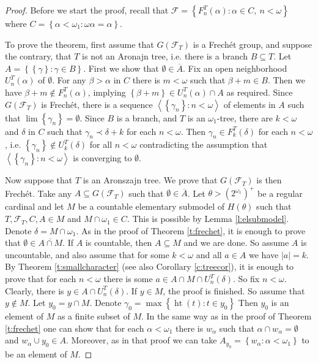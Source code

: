 \documentclass{amsart}
\theoremstyle{plain}
\theoremstyle{definition}
\numberwithin{equation}{section}
\renewcommand{\a}{\alpha}
\renewcommand{\b}{\beta}
\newcommand{\g}{\gamma}
\renewcommand{\d}{\delta}
\renewcommand{\o}{\omega}
\newcommand{\ps}{\emptyset}
\newcommand{\sst}{\subseteq}
\newcommand{\seq}[1]{\left<#1\right>}
\newcommand{\set}[1]{\left\{#1\right\}}
\newcommand{\abs}[1]{\left\vert#1\right\vert}
\newcommand{\h}{\operatorname{ht}}
\begin{document}
\begin{proof}
	Before we start the proof, recall that $\mathcal F=\set{F^T_n(\a)
	:\a\in C,\ n<\o}$ where $C=\set{\a<\o_1:\o\a=\a}$.

	To prove the theorem, first assume that $G(\mathcal F_T)$ is a Frech\'et group, and suppose the contrary, that $T$ is not an Aronajn tree, i.e. there is a branch $B\sst T$.
    Let $A=\set{\set{\g}:\g\in B}$.
    First we show that $\ps \in \overline{A}$.
    Fix an open neighborhood $U^T_{n}(\a)$ of $\ps$.
	For any $\b>\a$ in $C$ there is $m<\o$ such that $\b+m\in B$.
	Then we have $\b+m\notin F^T_{n}(\a)$, implying $\set{\b+m}\in U^T_{n}(\a)\cap A$ as required.
	Since $G(\mathcal F_T)$ is Frech\'et, there is a sequence $\seq{\set{\g_n}:n<\o}$ of elements in $A$ such that $\lim\set{\g_n}=\ps$.
	Since $B$ is a branch, and $T$ is an $\o_1$-tree, there are $k<\o$ and $\d$ in $C$ such that $\g_n\prec\d+k$ for each $n<\o$.
	Then $\g_n\in F^T_{k}(\d)$ for each $n<\o$, i.e. $\set{\g_n}\notin U^T_{k}(\d)$ for all $n<\o$ contradicting the assumption that $\seq{\set{\g_n}:n<\o}$ is converging to $\ps$.

	Now suppose that $T$ is an Aronszajn tree.
	We prove that $G(\mathcal F_T)$ is then Frech\'et.
	Take any $A\sst G(\mathcal F_T)$ such that $\ps\in\overline{A}$.
	Let $\theta>\left(2^{\o_1}\right)^+$ be a regular cardinal and let $M$ be a countable elementary submodel of $H\left(\theta\right)$ such that $T,\mathcal F_T,C,A\in M$ and $M\cap \o_1\in C$.
	This is possible by Lemma \ref{l:elsubmodel}.
	Denote $\d=M\cap \o_1$.
	As in the proof of Theorem \ref{t:frechet}, it is enough to prove that $\ps\in\overline{A\cap M}$.
	If $A$ is countable, then $A\sst M$ and we are done.
	So assume $A$ is uncountable, and also assume that for some $k<\o$ and all $a\in A$ we have $\abs{a}=k$.
	By Theorem \ref{t:smallcharacter} (see also Corollary \ref{c:treecor}), it is enough to prove that for each $n<\o$ there is some $a\in A\cap M\cap U^T_n(\d)$.
	So fix $n<\o$.
	Clearly, there is $y\in A\cap U^T_n(\d)$.
	If $y\in M$, the proof is finished.
	So assume that $y\notin M$.
	Let $y_0=y\cap M$.
	Denote $\g_0=\max\set{\h(t):t\in y_0}$
	Then $y_0$ is an element of $M$ as a finite subset of $M$.
	In the same way as in the proof of Theorem \ref{t:frechet} one can show that for each $\a<\o_1$ there is $w_{\a}$ such that $\a\cap w_{\a}=\ps$ and $w_{\a}\cup y_0\in A$.
	Moreover, as in that proof we can take $A_{y_0}=\set{w_{\a}:\a<\o_1}$ to be an element of $M$. 
	

\end{proof}
\end{document}
